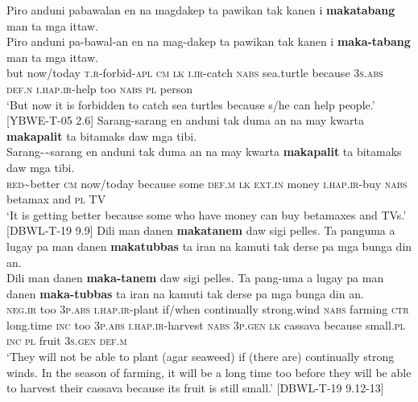 \ea
Piro  anduni  pabawalan  en  na  magdakep  ta  pawikan tak  kanen  i  \textbf{makatabang}  man  ta  mga  ittaw. \\\smallskip
 \gll Piro  anduni  pa-bawal-an  en  na  mag-dakep  ta  pawikan tak  kanen  i  \textbf{maka-tabang}  man  ta  mga  ittaw. \\
but  now/today  \textsc{t.r}-forbid-\textsc{apl}  \textsc{cm}  \textsc{lk}  \textsc{i.ir}-catch  \textsc{nabs}  sea.turtle
because  3\textsc{s.abs}  \textsc{def.n}  \textsc{i.hap.ir}-help  too  \textsc{nabs}  \textsc{pl} person \\
\glt `But now it is forbidden to catch sea turtles because s/he can help people.’ [YBWE-T-05 2.6]
\z
\ea
Sarang-sarang  en  anduni  tak  duma  an  na  may  kwarta \textbf{makapalit}  ta  bitamaks  daw  mga  tibi. \\\smallskip
 \gll Sarang-{}\sim{}sarang  en  anduni  tak  duma  an  na  may  kwarta \textbf{makapalit}  ta  bitamaks  daw  mga  tibi. \\
\textsc{red}\sim{}better  \textsc{cm}  now/today  because  some  \textsc{def.m}  \textsc{lk}  \textsc{ext.in}  money
\textsc{i.hap.ir}-buy  \textsc{nabs}  betamax  and  \textsc{pl}  TV \\
\glt `It is getting better because some who have money can buy betamaxes and TVs.’ [DBWL-T-19 9.9]
\z
\ea
\label{bkm:Ref120017342}
Dili  man  danen  \textbf{makatanem}  daw  sigi  pelles.  Ta panguma  a  lugay  pa  man  danen  \textbf{makatubbas} ta  iran  na  kamuti  tak  derse  pa  mga  bunga  din  an. \\\smallskip
 \gll Dili  man  danen  \textbf{maka-tanem}  daw  sigi  pelles.  Ta pang-uma  a  lugay  pa  man  danen  \textbf{maka-tubbas} ta  iran  na  kamuti  tak  derse  pa  mga  bunga  din  an. \\
\textsc{neg.ir}  too  3\textsc{p.abs}  \textsc{i.hap.ir}-plant  if/when  continually  strong.wind  \textsc{nabs}
farming  \textsc{ctr}  long.time  \textsc{inc}  too  3\textsc{p.abs}  \textsc{i.hap.ir}-harvest
\textsc{nabs}  3\textsc{p.gen}  \textsc{lk}  cassava  because  small.\textsc{pl}  \textsc{inc}  \textsc{pl}  fruit  3\textsc{s.gen}  \textsc{def.m} \\
\glt `They will not be able to plant (agar seaweed) if (there are) continually strong winds. In the season of farming, it will be a long time too before they will be able to harvest their cassava because its fruit is still small.’ [DBWL-T-19 9.12-13]
\z

